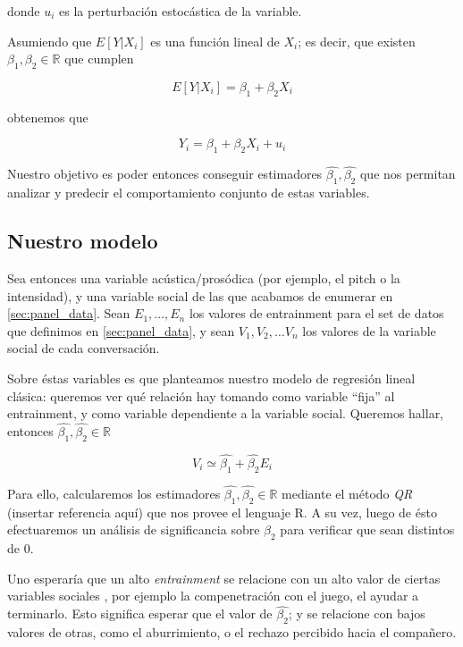 donde $u_i$ es la perturbación estocástica de la variable.

Asumiendo que $E[Y|X_i]$ es una función lineal de $X_i$; es decir, que existen $\beta_1, \beta_2 \in \mathbb{R}$ que cumplen

\begin{equation}
  E[Y|X_i] = \beta_1 + \beta_2 X_i
\end{equation}

obtenemos que

\begin{equation}
  Y_i = \beta_1 + \beta_2 X_i + u_i
\end{equation}

Nuestro objetivo es poder entonces conseguir estimadores $\widehat{\beta_1}, \widehat{\beta_2}$ que nos permitan analizar y predecir el comportamiento conjunto de estas variables.

\subsection{Nuestro modelo}

Sea entonces una variable acústica/prosódica (por ejemplo, el pitch o la intensidad), y una variable social de las que acabamos de enumerar en \ref{sec:panel_data}. Sean $E_1, \ldots, E_n$ los valores de entrainment para el set de datos que definimos en \ref{sec:panel_data}, y sean $V_1, V_2, \ldots V_n$ los valores de la variable social de cada conversación.

Sobre éstas variables es que planteamos nuestro modelo de regresión lineal clásica: queremos ver qué relación hay tomando como variable ``fija'' al entrainment, y como variable dependiente a la variable social. Queremos hallar, entonces $\widehat{\beta_1}, \widehat{\beta_2} \in \mathbb{R}$

\begin{equation}
  V_i \simeq \widehat{\beta_1} + \widehat{\beta_2} E_i
\end{equation}


Para ello, calcularemos los estimadores $\widehat{\beta_1}, \widehat{\beta_2} \in \mathbb{R}$ mediante el método \emph{QR} (insertar referencia aquí) que nos provee el lenguaje R. A su vez, luego de ésto efectuaremos un análisis de significancia sobre $\beta_2$ para verificar que sean distintos de 0.


Uno esperaría que un alto \emph{entrainment} se relacione con un alto valor de ciertas variables sociales \cite{BRE1996}, por ejemplo la compenetración con el juego, el ayudar a terminarlo. Esto significa esperar que el valor de $\widehat{\beta_2}$; y se relacione con bajos valores de otras, como el aburrimiento, o el rechazo percibido hacia el compañero.






